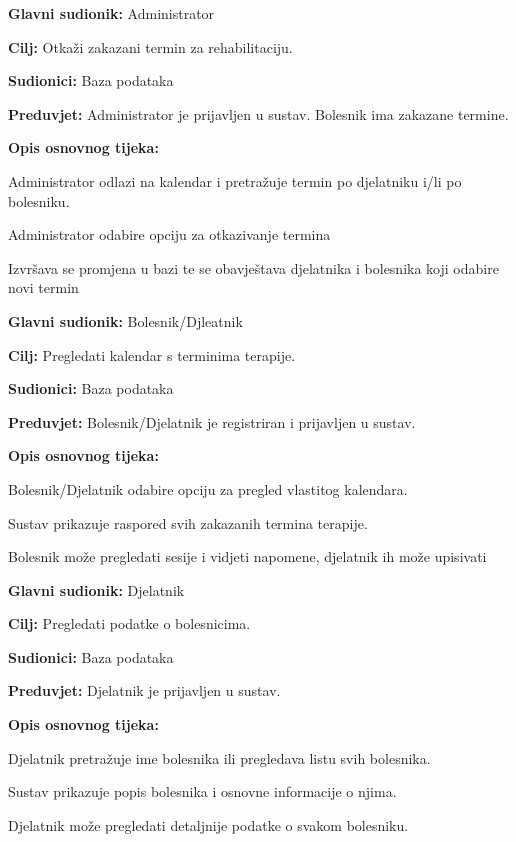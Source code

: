 	\item \textbf{Glavni sudionik:} Administrator
	\item \textbf{Cilj:} Otkaži zakazani termin za rehabilitaciju.
	\item \textbf{Sudionici:} Baza podataka
	\item \textbf{Preduvjet:} Administrator je prijavljen u sustav. Bolesnik ima zakazane termine.
	\item \textbf{Opis osnovnog tijeka:}
	\begin{packed_enum}
        \item Administrator odlazi na kalendar i pretražuje termin po djelatniku i/li po bolesniku.
		\item Administrator odabire opciju za otkazivanje termina 
        \item Izvršava se promjena u bazi te se obavještava djelatnika i bolesnika koji odabire novi termin 
	\end{packed_enum}
\closeusecase

	\item \textbf{Glavni sudionik:} Bolesnik/Djleatnik
	\item \textbf{Cilj:} Pregledati kalendar s terminima terapije.
	\item \textbf{Sudionici:} Baza podataka
	\item \textbf{Preduvjet:} Bolesnik/Djelatnik je registriran i prijavljen u sustav.
	\item \textbf{Opis osnovnog tijeka:}
	\begin{packed_enum}
		\item Bolesnik/Djelatnik odabire opciju za pregled vlastitog kalendara.
		\item Sustav prikazuje raspored svih zakazanih termina terapije.
        \item Bolesnik može pregledati sesije i vidjeti napomene, djelatnik ih može upisivati
	\end{packed_enum}
\closeusecase

	\item \textbf{Glavni sudionik:} Djelatnik
	\item \textbf{Cilj:} Pregledati podatke o bolesnicima.
	\item \textbf{Sudionici:} Baza podataka
	\item \textbf{Preduvjet:} Djelatnik je prijavljen u sustav.
	\item \textbf{Opis osnovnog tijeka:}
	\begin{packed_enum}
		\item Djelatnik pretražuje ime bolesnika ili pregledava listu svih bolesnika.
		\item Sustav prikazuje popis bolesnika i osnovne informacije o njima.
		\item Djelatnik može pregledati detaljnije podatke o svakom bolesniku.
	\end{packed_enum}
\closeusecase


